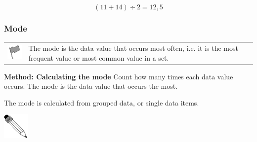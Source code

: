 \begin{description}[noitemsep]
\begin{description}[noitemsep]
{\begin{mdframed}[linewidth=4, leftmargin=40, rightmargin=40]
\begin{exercise}
\begin{enumerate}[noitemsep, label=\textbf{Step} \textbf{\arabic*}. ]
    \begin{equation}
    \left(11+14\right)÷2=12,5\tag{16.4}
      \end{equation}
          \end{enumerate}
    \end{exercise}
    \end{mdframed}
    }
    \noindent
        \label{m39400*uid69}
            \subsubsection{ Mode}
            \nopagebreak
\par
            \label{m39400*fhsst!!!underscore!!!id1497}\begin{definition}
	  \begin{tabular*}{15 cm}{m{15 mm}m{}}
	\hspace*{-50pt}  \includegraphics[width=0.5in]{col11306.imgs/psflag2.png}   & \Definition{   \label{id2622125}\textbf{ Mode }} { \label{m39400*meaningfhsst!!!underscore!!!id1497}
          \label{m39400*id212182}The mode is the data value that occurs most often, i.e. it is the most frequent value or most common value in a set. \par 
           } 
      \end{tabular*}
      \end{definition}
          \label{m39400*id212194}\textbf{Method: Calculating the mode}
Count how many times each data value occurs. The mode is the data value that occurs the most.\par 
          \label{m39400*id212203}The mode is calculated from grouped data, or single data items.\par 
\label{m39400*secfhsst!!!underscore!!!id1503}\vspace{.5cm} 
      \noindent
      \hspace*{-30pt}\includegraphics[width=0.5in]{col11306.imgs/pspencil2.png}   
\end{description}
\end{description}
